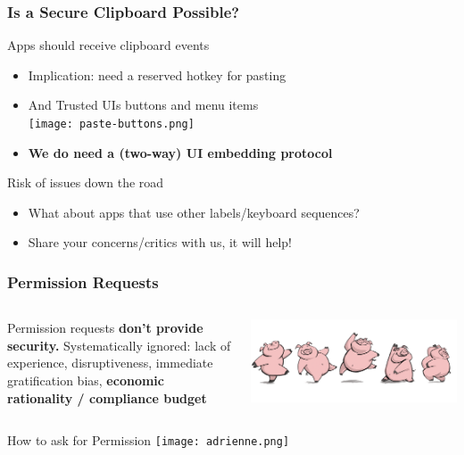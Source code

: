 \begin{frame}
\frametitle{Is a Secure Clipboard Possible?}

  \begin{block}{Apps should receive clipboard events}
  \begin{itemize}
  \item Implication: need a reserved hotkey for pasting 
  \item And Trusted UIs buttons and menu items
	  \\\hspace{3em} \texttt{[image: paste-buttons.png]}
  \item \textbf{We do need a (two-way) UI embedding protocol}
  \end{itemize}
  \end{block}

  \begin{block}{Risk of issues down the road}
  \begin{itemize}
  \item What about apps that use other labels/keyboard sequences?
  \item Share your concerns/critics with us, it will help!
  \end{itemize}
  \end{block}
\end{frame}



\begin{frame}
\frametitle{ Permission Requests}

  \begin{columns}[T]
    \begin{column}{0.6\paperwidth}
    \vspace{1.2em}
    Permission requests \textbf{don't provide security.} Systematically ignored: lack of experience, disruptiveness, immediate gratification bias, \textbf{economic rationality / compliance budget}
    \end{column}
    \begin{column}{0.33\paperwidth}
      \includegraphics[scale=0.2]{figures/pigs.png}
    \end{column}
  \end{columns}

  \begin{block}{How to ask for Permission {}}
  \texttt{[image: adrienne.png]}
  \end{block}
\end{frame}



